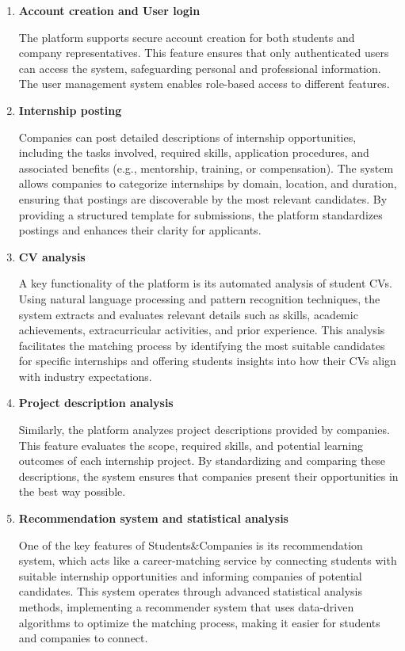 \begin{enumerate}

\item \textbf{Account creation and User login}

The platform supports secure account creation for both students and company representatives. This feature ensures that only authenticated users can access the system, safeguarding personal and professional information. The user management system enables role-based access to different features.

\item \textbf{Internship posting}

Companies can post detailed descriptions of internship opportunities, including the tasks involved, required skills, application procedures, and associated benefits (e.g., mentorship, training, or compensation). The system allows companies to categorize internships by domain, location, and duration, ensuring that postings are discoverable by the most relevant candidates. By providing a structured template for submissions, the platform standardizes postings and enhances their clarity for applicants.

\item \textbf{CV analysis}

A key functionality of the platform is its automated analysis of student CVs. Using natural language processing and pattern recognition techniques, the system extracts and evaluates relevant details such as skills, academic achievements, extracurricular activities, and prior experience. This analysis facilitates the matching process by identifying the most suitable candidates for specific internships and offering students insights into how their CVs align with industry expectations.

\item \textbf{Project description analysis}

Similarly, the platform analyzes project descriptions provided by companies. This feature evaluates the scope, required skills, and potential learning outcomes of each internship project. By standardizing and comparing these descriptions, the system ensures that companies present their opportunities in the best way possible.

\pagebreak
\item \textbf{Recommendation system and statistical analysis}

One of the key features of Students\&Companies is its recommendation system, which acts like a career-matching service by connecting students with suitable internship opportunities and informing companies of potential candidates. This system operates through advanced statistical analysis methods, implementing a recommender system that uses data-driven algorithms to optimize the matching process, making it easier for students and companies to connect. 


\end{enumerate}
